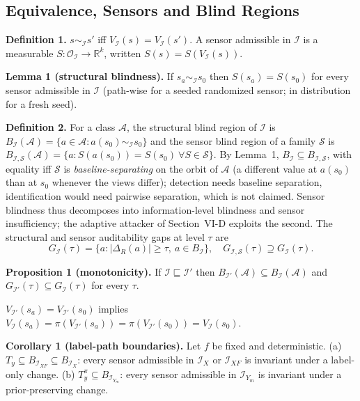 \documentclass[10pt,journal,compsoc]{IEEEtran}
\newcommand{\IX}{\mathcal I_X}
\newcommand{\IXF}{\mathcal I_{XF}}
\newcommand{\IYm}{\mathcal I_{Y_m}}
\begin{document}
\subsection{Equivalence, Sensors and Blind Regions}

\textbf{Definition 1.} $s\sim_{\mathcal I}s'$ iff
$V_{\mathcal I}(s)=V_{\mathcal I}(s')$. A sensor admissible in $\mathcal I$ is a
measurable $S:\mathcal O_{\mathcal I}\to\mathbb R^k$, written
$S(s)=S(V_{\mathcal I}(s))$.

\textbf{Lemma 1 (structural blindness).} If $s_a\sim_{\mathcal I}s_0$ then
$S(s_a)=S(s_0)$ for every sensor admissible in $\mathcal I$ (path-wise for a
seeded randomized sensor; in distribution for a fresh seed).

\textbf{Definition 2.} For a class $\mathcal A$, the structural blind region
of $\mathcal I$ is
$B_{\mathcal I}(\mathcal A)=\{a\in\mathcal A: a(s_0)\sim_{\mathcal I}s_0\}$ and
the sensor blind region of a family $\mathcal S$ is
$B_{\mathcal I,\mathcal S}(\mathcal A)=\{a:S(a(s_0))=S(s_0)\ \forall S\in\mathcal S\}$.
By Lemma~1, $B_{\mathcal I}\subseteq B_{\mathcal I,\mathcal S}$, with equality
iff $\mathcal S$ is \emph{baseline-separating} on the orbit of $\mathcal A$
(a different value at $a(s_0)$ than at $s_0$ whenever the views differ);
detection needs baseline separation, identification would need pairwise
separation, which is not claimed. Sensor blindness thus decomposes into
information-level blindness and sensor insufficiency; the adaptive attacker
of Section~VI-D exploits the second. The structural and sensor auditability
gaps at level $\tau$ are
\begin{equation}
  G_{\mathcal I}(\tau)=\{a:|\Delta_R(a)|\ge\tau,\ a\in B_{\mathcal I}\},\quad
  G_{\mathcal I,\mathcal S}(\tau)\supseteq G_{\mathcal I}(\tau).
  \label{eq:gap}
\end{equation}

\textbf{Proposition 1 (monotonicity).} If $\mathcal I\sqsubseteq\mathcal I'$
then $B_{\mathcal I'}(\mathcal A)\subseteq B_{\mathcal I}(\mathcal A)$ and
$G_{\mathcal I'}(\tau)\subseteq G_{\mathcal I}(\tau)$ for every $\tau$.

\begin{IEEEproof}
$V_{\mathcal I'}(s_a)=V_{\mathcal I'}(s_0)$ implies
$V_{\mathcal I}(s_a)=\pi(V_{\mathcal I'}(s_a))=\pi(V_{\mathcal I'}(s_0))=V_{\mathcal I}(s_0)$.
\end{IEEEproof}

\textbf{Corollary 1 (label-path boundaries).} Let $f$ be fixed and
deterministic. (a) $T_y\subseteq B_{\IXF}\subseteq B_{\IX}$: every sensor
admissible in $\IX$ or $\IXF$ is invariant under a label-only change.
(b) $T_y^{\pi}\subseteq B_{\IYm}$: every sensor admissible in $\IYm$ is
invariant under a prior-preserving change.
\end{document}
